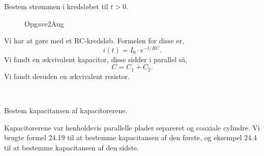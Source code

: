 
\title{\vspace{-1cm}\vspace{-1cm}}
\author{}
\date{}


\maketitle
\thispagestyle{fancy}
\begin{exercise}
\end{exercise}
\begin{subexercise}[a]
Bestem strømmen i kredsløbet til $t>0$.
\end{subexercise}
\begin{figure}[ht]
    \centering
    \caption{Opgave2Aug}
    \label{fig:opgave2aug}
\end{figure}
\begin{solution}
Vi har at gøre med et RC-kredsløb. Formelen for disse er,
\[
	i(t) = I_0\cdot e^{-t / RC}
.\]
Vi fandt en ækvivalent kapacitor, disse sidder i parallel så,
\[
C = C_1 + C_2
.\] 
Vi fandt desuden en ækvivalent resistor.
\end{solution}\\

\begin{subexercise}[b]
	Bestem kapacitansen af kapacitorerene.
\end{subexercise}
\begin{solution}
Kapacitorerene var henholdsvis parallelle plader separeret og coaxiale cylindre. Vi brugte formel 24.19 til at bestemme kapacitansen af den første, og eksempel 24.4 til at bestemme kapacitansen af den sidste.
\end{solution}

